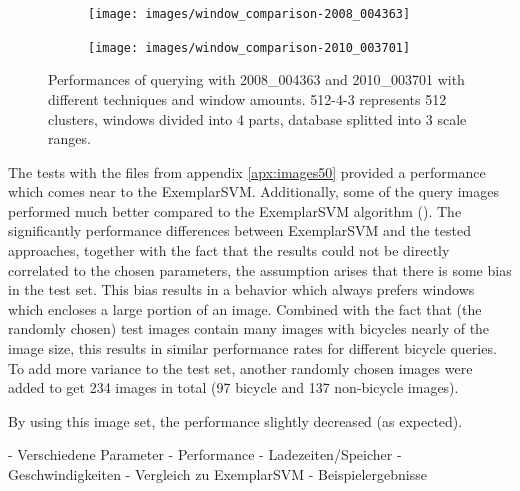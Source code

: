 \begin{figure}
\begin{subfigure}{\textwidth}
\centering
\texttt{[image: images/window\_comparison-2008\_004363]}
\end{subfigure}

\begin{subfigure}{\textwidth}
\centering
\texttt{[image: images/window\_comparison-2010\_003701]}
\end{subfigure}
\caption[Performances of querying with 2008\_004363 and 2010\_003701 with different techniques and window amounts]{Performances of querying with 2008\_004363 and 2010\_003701 with different techniques and window amounts. 512-4-3 represents 512 clusters, windows divided into 4 parts, database splitted into 3 scale ranges.}
\label{fig:performance_query_params}
\end{figure}


The tests with the files from appendix \ref{apx:images50} provided a performance which comes near to the ExemplarSVM. Additionally, some of the query images performed much better compared to the ExemplarSVM algorithm (). The significantly performance differences between ExemplarSVM and the tested approaches, together with the fact that the results could not be directly correlated to the chosen parameters, the assumption arises that there is some bias in the test set. This bias results in a behavior which always prefers windows which encloses a large portion of an image. Combined with the fact that (the randomly chosen) test images contain many images with bicycles nearly of the image size, this results in similar performance rates for different bicycle queries. To add more variance to the test set, another randomly chosen images were added to get 234 images in total (97 bicycle and 137 non-bicycle images).

By using this image set, the performance slightly decreased (as expected). 

- Verschiedene Parameter
- Performance
- Ladezeiten/Speicher
- Geschwindigkeiten
- Vergleich zu ExemplarSVM
- Beispielergebnisse
